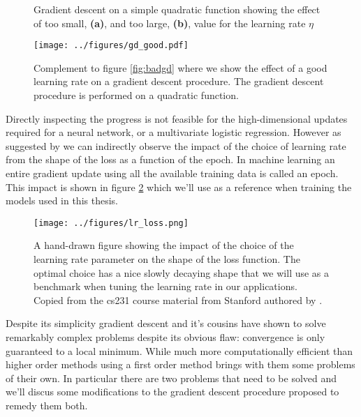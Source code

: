 \begin{figure}
\centering
\caption[Sub-optimal gradient descent]{Gradient descent on a simple quadratic function showing the effect of too small, \textbf{(a)}, and too large, \textbf{(b)}, value for the learning rate $\eta$}\label{fig:badgd}
\texttt{[image: ../figures/gd\_good.pdf]}
\caption[Optimal gradient descent]{Complement to figure \ref{fig:badgd} where we show the effect of a good learning rate on a gradient descent procedure. The gradient descent procedure is performed on a quadratic function.}\label{fig:goodgd}
\end{figure}

Directly inspecting the progress is not feasible for the high-dimensional updates required for a neural network, or a multivariate logistic regression. However as suggested by \citet{Karpathy} we can indirectly observe the impact of the choice of learning rate from the shape of the loss as a function of the epoch. In machine learning an entire gradient update using all the available training data is called an epoch. This impact is shown in figure \ref{fig:lrloss} which we'll use as a reference when training the models used in this thesis. 

\begin{figure}
\centering
\texttt{[image: ../figures/lr\_loss.png]}
\caption[The impact of $\eta$ on performance]{A hand-drawn figure showing the impact of the choice of the learning rate parameter on the shape of the loss function. The optimal choice has a nice slowly decaying shape that we will use as a benchmark when tuning the learning rate in our applications. Copied from the cs231 course material from Stanford authored by \citet{Karpathy}.}\label{fig:lrloss}

\end{figure} 

Despite its simplicity gradient descent and it's cousins have shown to solve remarkably complex problems despite its obvious flaw: convergence is only guaranteed to a local minimum. While much more computationally efficient than higher order methods using a first order method brings with them some problems of their own. In particular there are two problems that need to be solved and we'll discus some modifications to the gradient descent procedure proposed to remedy them both. 


